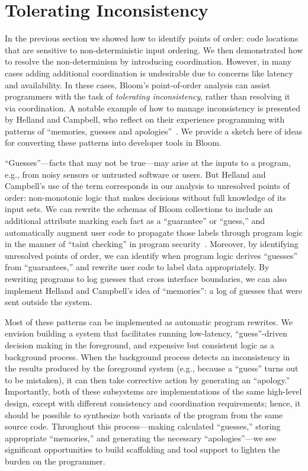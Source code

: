 \section{Tolerating Inconsistency}
\label{sec:inconsistency}
In the previous section we showed how to identify points of order:  code locations that are sensitive to non-deterministic input ordering.  We then demonstrated how to resolve the non-determinism by introducing coordination.
However, in many cases adding
additional coordination is undesirable due to concerns like latency and availability. In these cases, Bloom's point-of-order analysis can assist programmers with the task of \emph{tolerating inconsistency}, rather
than resolving it via coordination.  A notable example of how to manage
inconsistency is presented by Helland and Campbell, who reflect on their
experience programming with patterns of ``memories, guesses and
apologies''~\cite{quicksand}.  We provide a sketch here of ideas for converting
these patterns into developer tools in Bloom.

``Guesses''---facts that may not be true---may arise at the inputs to a program,
e.g., from noisy sensors or untrusted software or users.  But Helland and
Campbell's use of the term corresponds in our analysis to unresolved points of
order: non-monotonic logic that makes decisions without full knowledge of its
input sets.  We can rewrite the schemas of Bloom collections to include an
additional attribute marking each fact as a ``guarantee'' or ``guess,'' and
automatically augment user code to propagate those labels through program logic
in the manner of ``taint checking'' in program security~\cite{taint,asbestos}.
Moreover, by identifying unresolved points of order, we can identify when
program logic derives ``guesses'' from ``guarantees,'' and rewrite user code to
label data appropriately. By rewriting programs to log guesses that cross
interface boundaries, we can also implement Helland and Campbell's idea of
``memories'': a log of guesses that were sent outside the system.

Most of these patterns can be implemented as automatic program rewrites. We
envision building a system that facilitates running low-latency,
``guess''-driven decision making in the foreground, and expensive but consistent
logic as a background process. When the background process detects an
inconsistency in the results produced by the foreground system (e.g., because a
``guess'' turns out to be mistaken), it can then take corrective action by
generating an ``apology.'' Importantly, both of these subsystems are
implementations of the same high-level design, except with different consistency
and coordination requirements; hence, it should be possible to synthesize both
variants of the program from the same source code. Throughout this
process---making calculated ``guesses,'' storing appropriate ``memories,'' and
generating the necessary ``apologies''---we see significant opportunities to
build scaffolding and tool support to lighten the burden on the programmer.

